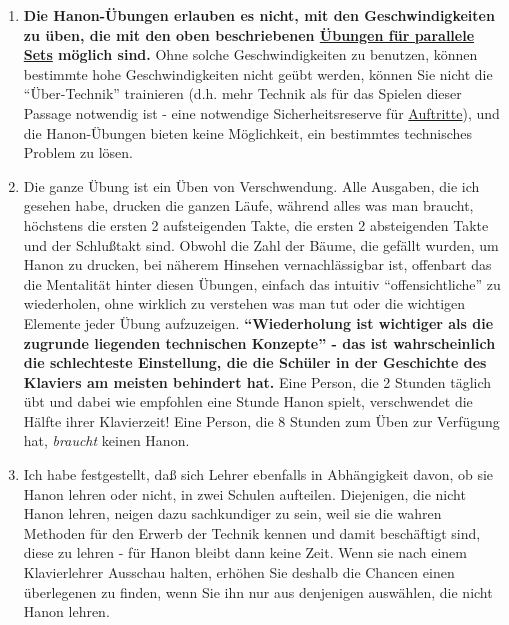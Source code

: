 \begin{enumerate}[label={\roman*.}]
\item \hypertarget{c1iii7h8}{}\textbf{Die Hanon-Übungen erlauben es nicht, mit den Geschwindigkeiten zu üben, die mit den oben beschriebenen \hyperlink{c1iii7b}{Übungen für parallele Sets} möglich sind.}
Ohne solche Geschwindigkeiten zu benutzen, können bestimmte hohe Geschwindigkeiten nicht geübt werden, können Sie nicht die \enquote{Über-Technik} trainieren (d.h. mehr Technik als für das Spielen dieser Passage notwendig ist - eine notwendige Sicherheitsreserve für \hyperlink{c1iii14}{Auftritte}), und die Hanon-Übungen bieten keine Möglichkeit, ein bestimmtes technisches Problem zu lösen.



\item \hypertarget{c1iii7h9}{}Die ganze Übung ist ein Üben von Verschwendung.
Alle Ausgaben, die ich gesehen habe, drucken die ganzen Läufe, während alles was man braucht, höchstens die ersten 2 aufsteigenden Takte, die ersten 2 absteigenden Takte und der Schlußtakt sind.
Obwohl die Zahl der Bäume, die gefällt wurden, um Hanon zu drucken, bei näherem Hinsehen vernachlässigbar ist, offenbart das die Mentalität hinter diesen Übungen, einfach das intuitiv \enquote{offensichtliche} zu wiederholen, ohne wirklich zu verstehen was man tut oder die wichtigen Elemente jeder Übung aufzuzeigen.
\textbf{\enquote{Wiederholung ist wichtiger als die zugrunde liegenden technischen Konzepte} - das ist wahrscheinlich die schlechteste Einstellung, die die Schüler in der Geschichte des Klaviers am meisten behindert hat.}
Eine Person, die 2 Stunden täglich übt und dabei wie empfohlen eine Stunde Hanon spielt, verschwendet die Hälfte ihrer Klavierzeit!
Eine Person, die 8 Stunden zum Üben zur Verfügung hat, \textit{braucht} keinen Hanon.



\item \hypertarget{c1iii7h10}{}Ich habe festgestellt, daß sich Lehrer ebenfalls in Abhängigkeit davon, ob sie Hanon lehren oder nicht, in zwei Schulen aufteilen.
Diejenigen, die nicht Hanon lehren, neigen dazu sachkundiger zu sein, weil sie die wahren Methoden für den Erwerb der Technik kennen und damit beschäftigt sind, diese zu lehren - für Hanon bleibt dann keine Zeit.
Wenn sie nach einem Klavierlehrer Ausschau halten, erhöhen Sie deshalb die Chancen einen überlegenen zu finden, wenn Sie ihn nur aus denjenigen auswählen, die nicht Hanon lehren.

 
 \end{enumerate} 


